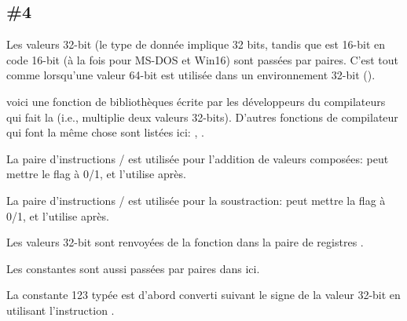 \subsection{\Example{} \#4}

\label{win16_32bit_values}





Les valeurs 32-bit (le type de donnée  implique 32 bits, tandis que \Tint
est 16-bit en code 16-bit (à la fois pour MS-DOS et Win16) sont passées par paires.
C'est tout comme lorsqu'une valeur 64-bit est utilisée dans un environnement 32-bit ().

voici une fonction de bibliothèques écrite par les développeurs du compilateurs qui
fait la  (i.e., multiplie deux valeurs 32-bits).
D'autres fonctions de compilateur qui font la même chose sont listées ici: , .

La paire d'instructions / est utilisée pour l'addition de valeurs
composées:  peut mettre le flag  à 0/1, et  l'utilise après.

La paire d'instructions / est utilisée pour la soustraction: 
peut mettre la flag  à 0/1, et  l'utilise après.

Les valeurs 32-bit sont renvoyées de la fonction dans la paire de registres .

Les constantes sont aussi passées par paires dans  ici.

La constante 123 typée \Tint{} est d'abord converti suivant le signe de la valeur
32-bit en utilisant l'instruction .
